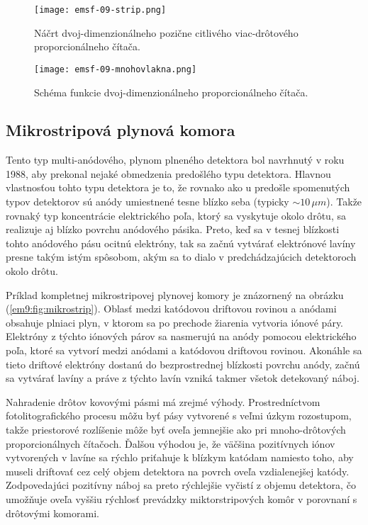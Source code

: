 \documentclass[../../main.tex]{subfiles}
\begin{document}
\begin{figure}[!h]
\texttt{[image: emsf-09-strip.png]}
\centering
\caption{Náčrt dvoj-dimenzionálneho pozične citlivého viac-drôtového proporcionálneho čítača.}
\label{em9:fig:strip}
\end{figure}
\begin{figure}[!h]
\texttt{[image: emsf-09-mnohovlakna.png]}
\centering
\caption{Schéma funkcie dvoj-dimenzionálneho proporcionálneho čítača.}
\label{em9:fig:mnohovlakna}
\end{figure}

\subsection{Mikrostripová plynová komora}
Tento typ multi-anódového, plynom plneného detektora bol navrhnutý v roku 1988, aby prekonal nejaké obmedzenia predošlého typu detektora. Hlavnou vlastnosťou tohto typu detektora je to, že rovnako ako u predošle spomenutých typov detektorov sú anódy umiestnené tesne blízko seba (typicky $\sim 10\,\mu m$). Takže rovnaký typ koncentrácie elektrického poľa, ktorý sa vyskytuje okolo drôtu, sa realizuje aj blízko povrchu anódového pásika. Preto, keď sa v tesnej blízkosti tohto anódového pásu ocitnú elektróny, tak sa začnú vytvárať elektrónové lavíny presne takým istým spôsobom, akým sa to dialo v predchádzajúcich detektoroch okolo drôtu.

Príklad kompletnej mikrostripovej plynovej komory je znázornený na obrázku (\ref{em9:fig:mikrostrip}). Oblasť medzi katódovou driftovou rovinou a anódami obsahuje plniaci plyn, v ktorom sa po prechode žiarenia vytvoria iónové páry. Elektróny z týchto iónových párov sa nasmerujú na anódy pomocou elektrického poľa, ktoré  sa vytvorí medzi anódami a katódovou driftovou rovinou. Akonáhle sa tieto driftové elektróny dostanú do bezprostrednej blízkosti povrchu anódy, začnú sa vytvárať lavíny a práve z týchto lavín vzniká takmer všetok detekovaný náboj. 

Nahradenie drôtov kovovými pásmi má zrejmé výhody. Prostredníctvom fotolitografického procesu môžu byť pásy vytvorené s veľmi úzkym rozostupom, takže priestorové rozlíšenie môže byť oveľa jemnejšie ako pri mnoho-drôtových proporcionálnych čítačoch. Ďalšou výhodou je, že väčšina pozitívnych iónov vytvorených v lavíne sa rýchlo priťahuje k blízkym katódam namiesto toho, aby museli driftovať cez celý objem detektora na povrch oveľa vzdialenejšej katódy. Zodpovedajúci pozitívny náboj sa preto rýchlejšie vyčistí z objemu detektora, čo umožňuje oveľa vyššiu rýchlosť prevádzky miktorstripových komôr v porovnaní s drôtovými komorami.
\end{document}
